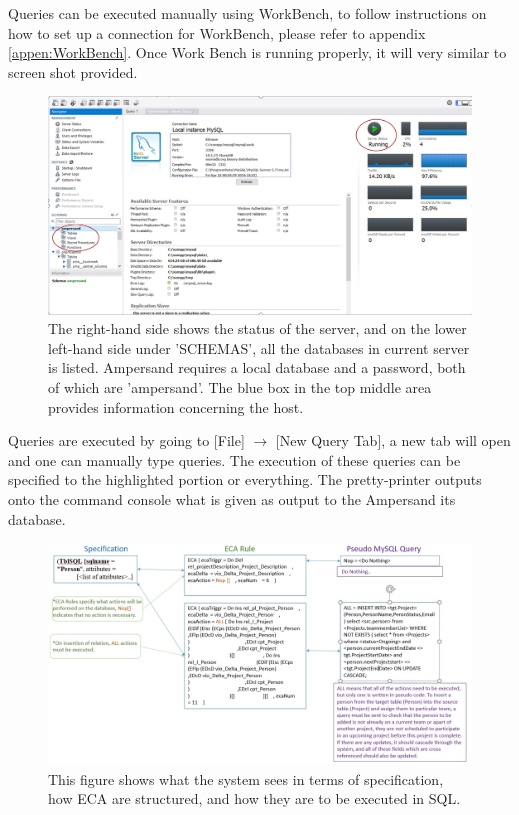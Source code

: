 Queries can be executed manually using WorkBench, to follow instructions on how 
to set up a connection for WorkBench, please refer to appendix 
\ref{appen:WorkBench}. Once Work Bench is running properly, it will very 
similar to screen shot provided.
\begin{figure}[!h]
    \includegraphics[width=\textwidth]{images/WorkBench}
    \caption{\footnotesize{The right-hand side shows the status of the server, 
    and on the lower left-hand side under 'SCHEMAS', all the databases in 
    current server is listed. Ampersand requires a local database and a 
    password, both of which are 'ampersand'. The blue box in the top middle 
    area provides information concerning the host. }}
\end{figure}

Queries are executed by going to [File] $\rightarrow$ [New Query Tab], a new 
tab will open and one can manually type queries. The execution of these queries 
can be specified to the highlighted portion or everything. The pretty-printer 
outputs onto the command console what is given as output to the Ampersand its 
database. 

\begin{figure}[!h]
    \includegraphics[width=\textwidth]{images/sqlquery}
    \caption{\footnotesize{This figure shows what the system sees in terms of 
    specification, how ECA are structured, and how they are to be executed in 
    SQL. }}
\end{figure}





